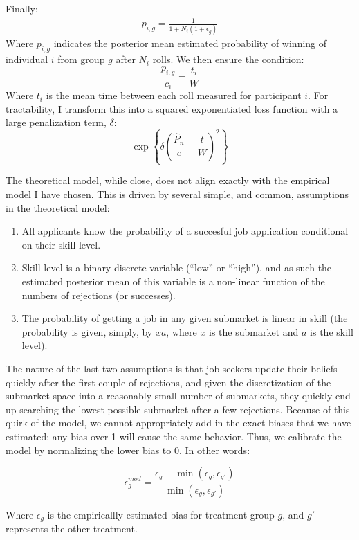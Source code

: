 \documentclass[a4paper,12pt]{article}
\begin{document}
Finally:
\begin{align*}
  p_{i,g} = \frac{1}{1 + N_i(1 + \epsilon_g)}
\end{align*}
Where $p_{i,g}$ indicates the posterior mean estimated probability of winning of individual $i$ from group $g$ after $N_i$ rolls. We then ensure the condition:
$$
\frac{p_{i,g}}{c_i} = \frac{t_i}{W}
$$
Where $t_i$ is the mean time between each roll measured for participant $i$. For tractability, I transform this into a squared exponentiated loss function with a large penalization term, $\delta$:
$$
\exp \left\{ \delta \left(\frac{\hat{P}_n}{c} - \frac{t}{W} \right)^2 \right\}
$$

The theoretical model, while close, does not align exactly with the empirical model I have chosen. This is driven by several simple, and common, assumptions in the theoretical model:
%
\begin{enumerate}
\item All applicants know the probability of a succesful job application conditional on their skill level.
\item Skill level is a binary discrete variable (``low'' or ``high''), and as such the estimated posterior mean of this variable is a non-linear function of the numbers of rejections (or successes).
\item The probability of getting a job in any given submarket is linear in skill (the probability is given, simply, by $xa$, where $x$ is the submarket and $a$ is the skill level).
\end{enumerate}

The nature of the last two assumptions is that job seekers update their beliefs quickly after the first couple of rejections, and given the discretization of the submarket space into a reasonably small number of submarkets, they quickly end up searching the lowest possible submarket after a few rejections. Because of this quirk of the model, we cannot appropriately add in the exact biases that we have estimated: any bias over 1 will cause the same behavior. Thus, we calibrate the model by normalizing the lower bias to 0. In other words:

\begin{equation} \label {eq:epsilon-model}
\epsilon^{mod}_{g} = \frac{\epsilon_g - \min(\epsilon_g, \epsilon_{g'})}{\min (\epsilon_g, \epsilon_{g'})}
\end{equation}

Where $\epsilon_{g}$ is the empiricallly estimated bias for treatment group $g$, and $g'$ represents the other treatment.
\end{document}
